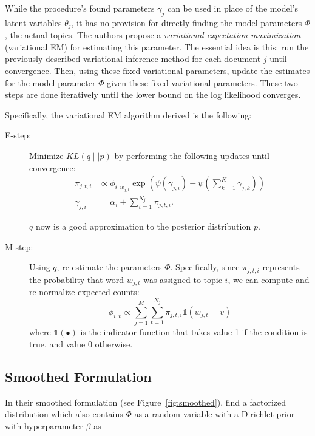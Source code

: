 \documentclass[11pt]{article}
\begin{document}
While the procedure's found parameters $\gamma_j$ can be used in place of
the model's latent variables $\theta_j$, it has no provision for directly
finding the model parameters $\Phi$, the actual topics. The authors propose
a \emph{variational expectation maximization} (variational EM) for
estimating this parameter. The essential idea is this: run the previously
described variational inference method for each document $j$ until
convergence. Then, using these fixed variational parameters, update the
estimates for the model parameter $\Phi$ given these fixed variational
parameters. These two steps are done iteratively until the lower bound on
the log likelihood converges.

Specifically, the variational EM algorithm derived is the following:
\begin{description}
  \item[E-step:]
    Minimize $KL(q \mid\mid p)$ by performing the following updates until
    convergence:
    \begin{align*}
      \pi_{j,t,i} &\propto
      \phi_{i,w_{j,t}} \exp \left(
        \psi(\gamma_{j,i}) - \psi\left(\sum_{k=1}^K \gamma_{j,k}\right)
      \right)\\
      \gamma_{j,i} &= \alpha_i + \sum_{t=1}^{N_j} \pi_{j,t,i}.
    \end{align*}

    $q$ now is a good approximation to the posterior distribution $p$.
  \item[M-step:] Using $q$, re-estimate the parameters $\Phi$.
    Specifically, since $\pi_{j,t,i}$ represents the probability that word
    $w_{j,t}$ was assigned to topic $i$, we can compute and re-normalize
    expected counts:
    \begin{equation}
        \phi_{i,v} \propto \sum_{j=1}^M
        \sum_{t=1}^{N_j} \pi_{j,t,i} \mathbb{1}(w_{j,t} = v)
        \label{eqn:varemphi}
    \end{equation}
    where $\mathbb{1}(\bullet)$ is the indicator function that takes value
    1 if the condition is true, and value 0 otherwise.
\end{description}

\subsection{Smoothed Formulation}

In their smoothed formulation (see Figure~\ref{fig:smoothed}),
\citet{Blei:2003:LDA} find a factorized distribution which also contains
$\Phi$ as a random variable with a Dirichlet prior with hyperparameter
$\beta$ as
\end{document}
